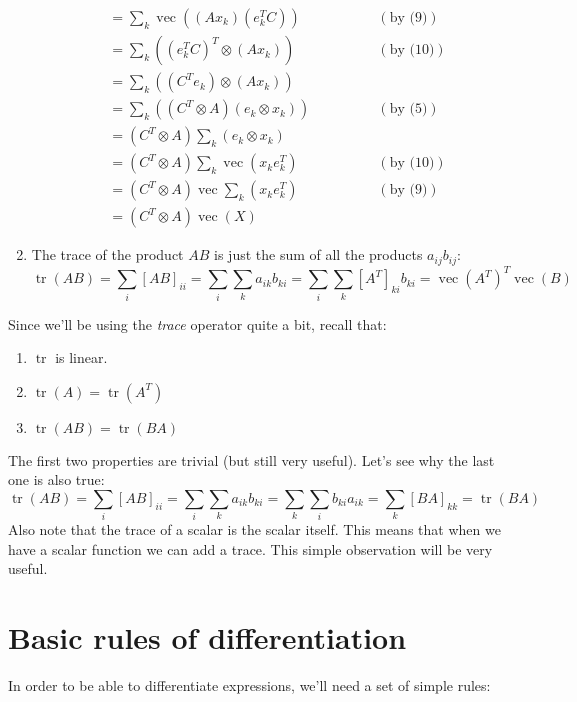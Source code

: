 \documentclass[a4paper,12pt]{article}
\begin{document}
\begin{enumerate}
$$\begin{align}
     &= \sum_k\operatorname{vec}((Ax_k)(e_k^T C)) & \qquad\qquad(\text{by (9)}) \\
     &= \sum_k((e_k^T C)^T\otimes (Ax_k)) & \qquad\qquad(\text{by (10)}) \\
     &= \sum_k((C^T e_k)\otimes(Ax_k)) \\
     &= \sum_k((C^T\otimes A)(e_k\otimes x_k)) & \qquad\qquad(\text{by (5)}) \\
     &= (C^T\otimes A)\sum_k(e_k\otimes x_k) \\
     &= (C^T\otimes A)\sum_k\operatorname{vec}(x_k e_k^T) & \qquad\qquad(\text{by (10)}) \\
     &= (C^T\otimes A)\operatorname{vec}\sum_k(x_k e_k^T) & \qquad\qquad(\text{by (9)}) \\
     &= (C^T\otimes A)\operatorname{vec}(X)
    \end{align}
    $$
    \item The trace of the product $AB$ is just the sum of all the products $a_{ij}b_{ij}$:
    $$\operatorname{tr}(AB) = \sum_i[AB]_{ii} = \sum_i\sum_k a_{ik}b_{ki} = \sum_i\sum_k[A^T]_{ki}b_{ki} = \operatorname{vec}(A^T)^T\operatorname{vec}(B)$$
\end{enumerate}
Since we'll be using the \emph{trace} operator quite a bit, recall that:
\begin{enumerate}
    \item $\operatorname{tr}$ is linear.
    \item $\operatorname{tr}(A) = \operatorname{tr}(A^T)$
    \item $\operatorname{tr}(AB) = \operatorname{tr}(BA)$
\end{enumerate}
The first two properties are trivial (but still very useful). Let's see why the last one is also true:
$$ \operatorname{tr}(AB) = \sum_i [AB]_{ii} = \sum_i \sum_k a_{ik}b_{ki} = \sum_k\sum_i b_{ki}a_{ik} = \sum_k[BA]_{kk} = \operatorname{tr}(BA)
$$ Also note that the trace of a scalar is the scalar itself. This means that when we have a scalar function we can add a trace. This simple observation will be very useful.

\section{Basic rules of differentiation}

In order to be able to differentiate expressions, we'll need a set of simple rules:
\end{document}
